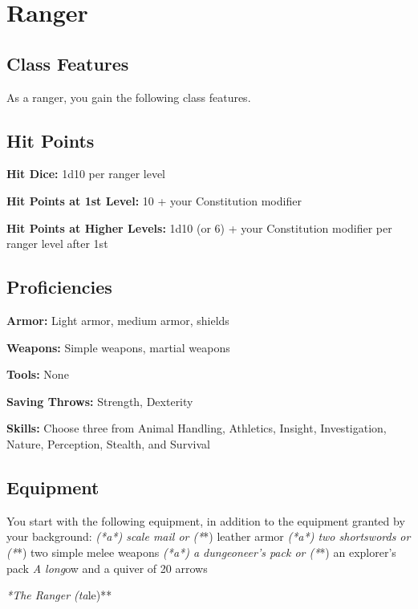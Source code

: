 \section{Ranger}

\subsection{Class Features}

As a ranger, you gain the following class features.

\subsection{Hit Points}

\textbf{Hit Dice:} 1d10 per ranger level

\textbf{Hit Points at 1st Level:} 10 + your Constitution modifier

\textbf{Hit Points at Higher Levels:} 1d10 (or 6) + your Constitution modifier per ranger level after 1st

\subsection{Proficiencies}

\textbf{Armor:} Light armor, medium armor, shields

\textbf{Weapons:} Simple weapons, martial weapons

\textbf{Tools:} None

\textbf{Saving Throws:} Strength, Dexterity

\textbf{Skills:} Choose three from Animal Handling, Athletics, Insight, Investigation, Nature, Perception, Stealth, and Survival

\subsection{Equipment}

You start with the following equipment, in addition to the equipment granted by your background:
\textit{ (*a*) scale mail or (*}*) leather armor
\textit{ (*a*) two shortswords or (*}*) two simple melee weapons
\textit{ (*a*) a dungeoneer’s pack or (*}*) an explorer’s pack
\textit{ A long}ow and a quiver of 20 arrows

\textit{*The Ranger (ta}le)**

